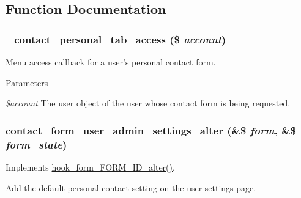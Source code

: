 \subsection{Function Documentation}
\hypertarget{contact_8module_a24a9029fc8494d445ef1c6f38868b521}{
\subsubsection[{\_\-contact\_\-personal\_\-tab\_\-access}]{\setlength{\rightskip}{0pt plus 5cm}\_\-contact\_\-personal\_\-tab\_\-access (\$ {\em account})}}
\label{contact_8module_a24a9029fc8494d445ef1c6f38868b521}
Menu access callback for a user's personal contact form.


\begin{DoxyParams}{Parameters}
\item[{\em \$account}]The user object of the user whose contact form is being requested. \end{DoxyParams}
\hypertarget{contact_8module_a6fcc27390159b5c3ae4794e3c18e3bd5}{
\subsubsection[{contact\_\-form\_\-user\_\-admin\_\-settings\_\-alter}]{\setlength{\rightskip}{0pt plus 5cm}contact\_\-form\_\-user\_\-admin\_\-settings\_\-alter (\&\$ {\em form}, \/  \&\$ {\em form\_\-state})}}
\label{contact_8module_a6fcc27390159b5c3ae4794e3c18e3bd5}
Implements \hyperlink{group__hooks_ga8d4a4089551493d55911bd5c4f218264}{hook\_\-form\_\-FORM\_\-ID\_\-alter()}.

Add the default personal contact setting on the user settings page.

